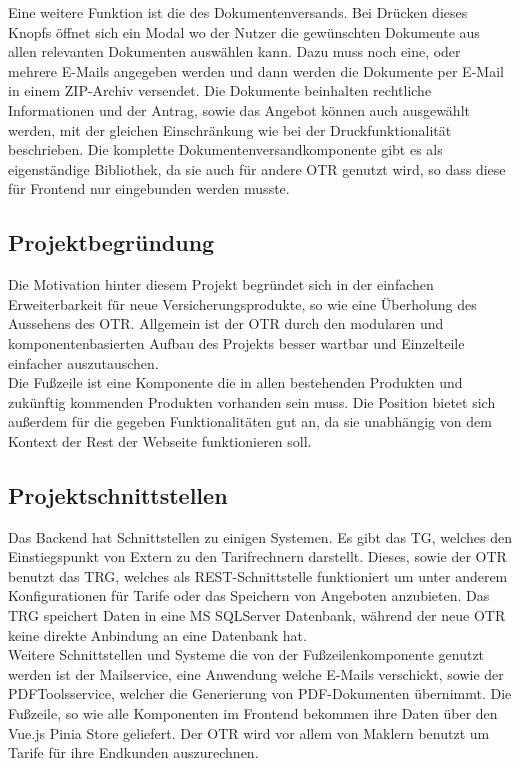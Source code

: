 Eine weitere Funktion ist die des Dokumentenversands. Bei Drücken dieses Knopfs öffnet sich ein Modal wo der Nutzer die gewünschten Dokumente aus allen relevanten Dokumenten auswählen kann. Dazu muss noch eine, oder mehrere E-Mails angegeben werden und dann werden die Dokumente per E-Mail in einem ZIP-Archiv versendet. Die Dokumente beinhalten rechtliche Informationen und der Antrag, sowie das Angebot können auch ausgewählt werden, mit der gleichen Einschränkung wie bei der Druckfunktionalität beschrieben. Die komplette Dokumentenversandkomponente gibt es als eigenständige Bibliothek, da sie auch für andere \ac{OTR} genutzt wird, so dass diese für Frontend nur eingebunden werden musste.

\subsection{Projektbegründung}
\label{projektbegründung}
Die Motivation hinter diesem Projekt begründet sich in der einfachen Erweiterbarkeit für neue Versicherungsprodukte, so wie eine Überholung des Aussehens des \ac{OTR}. Allgemein ist der \ac{OTR} durch den modularen und komponentenbasierten Aufbau des Projekts besser wartbar und Einzelteile einfacher auszutauschen. \\
Die Fußzeile ist eine Komponente die in allen bestehenden Produkten und zukünftig kommenden Produkten vorhanden sein muss. Die Position bietet sich außerdem für die gegeben Funktionalitäten gut an, da sie unabhängig von dem Kontext der Rest der Webseite funktionieren soll.
\subsection{Projektschnittstellen}
\label{projektschnittstellen}
Das Backend hat %
Schnittstellen zu einigen Systemen. Es gibt das \ac{TG}, welches den Einstiegspunkt von Extern zu den Tarifrechnern darstellt. Dieses, sowie der \ac{OTR} benutzt das \ac{TRG}, welches als REST-Schnittstelle funktioniert um unter anderem Konfigurationen für Tarife oder das Speichern von Angeboten anzubieten. Das \ac{TRG} speichert Daten in eine MS SQLServer Datenbank, während der neue \ac{OTR} keine direkte Anbindung an eine Datenbank hat. \\
Weitere Schnittstellen und Systeme die von der Fußzeilenkomponente genutzt werden ist der Mailservice, eine Anwendung welche E-Mails verschickt, sowie der PDFToolsservice, welcher die Generierung von PDF-Dokumenten übernimmt. Die Fußzeile, so wie alle Komponenten im Frontend bekommen ihre Daten über den Vue.js Pinia Store geliefert.
Der \ac{OTR} wird vor allem von Maklern benutzt um Tarife für ihre Endkunden auszurechnen.
